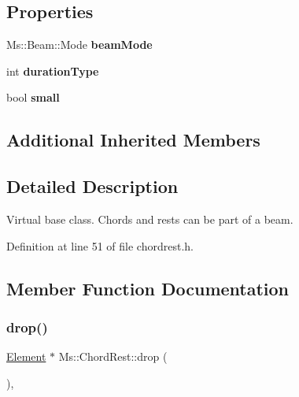 \subsection*{Properties}
\begin{DoxyCompactItemize}
\item 
\mbox{\label{class_ms_1_1_chord_rest_ae65b665587b3a1978734f353a2e4be5a}} 
Ms\+::\+Beam\+::\+Mode {\bfseries beam\+Mode}
\item 
\mbox{\label{class_ms_1_1_chord_rest_a7adc9e28cdc15ab6318456149b213035}} 
int {\bfseries duration\+Type}
\item 
\mbox{\label{class_ms_1_1_chord_rest_a157ff03e758baf92b4ccfc42cc4824ca}} 
bool {\bfseries small}
\end{DoxyCompactItemize}
\subsection*{Additional Inherited Members}


\subsection{Detailed Description}
Virtual base class. Chords and rests can be part of a beam. 

Definition at line 51 of file chordrest.\+h.



\subsection{Member Function Documentation}
\mbox{\label{class_ms_1_1_chord_rest_a1277a12746bf12af5cbf79d95ada6a21}} 
\subsubsection{\texorpdfstring{drop()}{drop()}}
{\footnotesize\ttfamily \hyperlink{class_ms_1_1_element}{Element} $\ast$ Ms\+::\+Chord\+Rest\+::drop (\begin{DoxyParamCaption}\item[{\hyperlink{class_ms_1_1_edit_data}{Edit\+Data} \&}]{ }\end{DoxyParamCaption})\hspace{0.3cm}{\ttfamily [override]}, {\ttfamily [virtual]}}


